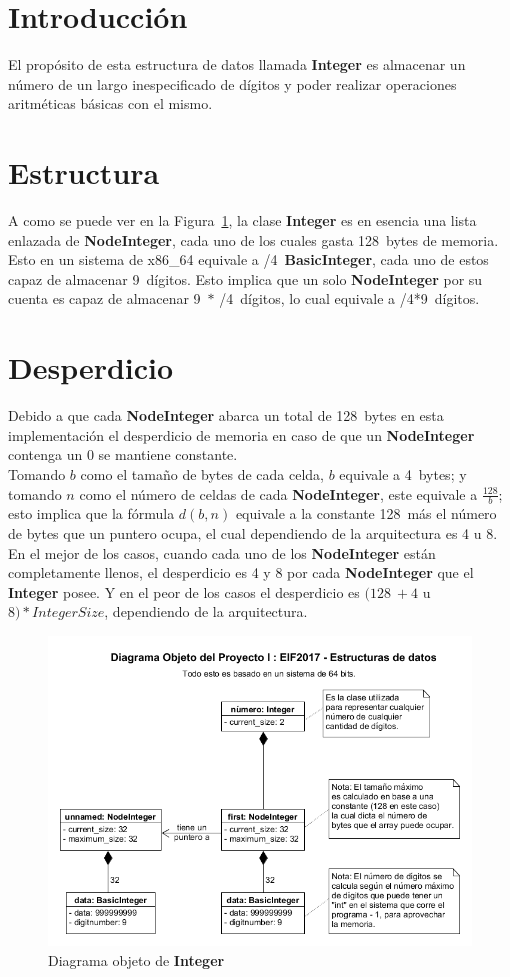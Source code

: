 \newcommand\bytes{128}
\newcommand\digits{9}
\newcommand\base{4}

\section{Introducción}
El propósito de esta estructura de datos llamada \textbf{Integer} es almacenar
un número de un largo inespecificado de dígitos y poder realizar operaciones
aritméticas básicas con el mismo.
\section{Estructura}
A como se puede ver en la Figura~\ref{fig:dig_obj}, la clase \textbf{Integer} es
en esencia una lista enlazada de \textbf{NodeInteger}, cada uno de los cuales
gasta \bytes\ bytes de memoria. Esto en un sistema de x86\_64 equivale a
\the\numexpr\bytes/\base\relax\ \textbf{BasicInteger}, cada uno de estos capaz
de almacenar \digits\ dígitos. Esto implica que un solo \textbf{NodeInteger} por su 
cuenta es capaz de almacenar \digits\ $*$ \the\numexpr\bytes/\base\relax\ dígitos,
lo cual equivale a \the\numexpr\bytes/\base*\digits\relax\ dígitos.
\section{Desperdicio}
Debido a que cada \textbf{NodeInteger} abarca un total de \bytes\ bytes en esta
implementación el desperdicio de memoria en caso de que un \textbf{NodeInteger}
contenga un 0 se mantiene constante.\\
Tomando $b$ como el tamaño de bytes de cada celda, $b$ equivale a \base\
bytes; y tomando $n$ como el número de celdas de cada \textbf{NodeInteger}, este
equivale a $\frac{\bytes}{b}$; esto implica que la fórmula $d(b, n)$ equivale a
la constante \bytes\ más el número de bytes que un puntero ocupa, el cual
dependiendo de la arquitectura es 4 u 8.\\
En el mejor de los casos, cuando cada uno de los \textbf{NodeInteger} están completamente
llenos, el desperdicio es 4 y 8 por cada \textbf{NodeInteger} que el
\textbf{Integer} posee. Y en el peor de los casos el desperdicio es $(\bytes\ + 4$
u $8) * IntegerSize$, dependiendo de la arquitectura.
\begin{figure}
\centering
  \includegraphics[width=0.7\columnwidth]{./img/object_diagram.png}
  \caption{Diagrama objeto de \textbf{Integer}}
\label{fig:dig_obj}
\end{figure}
